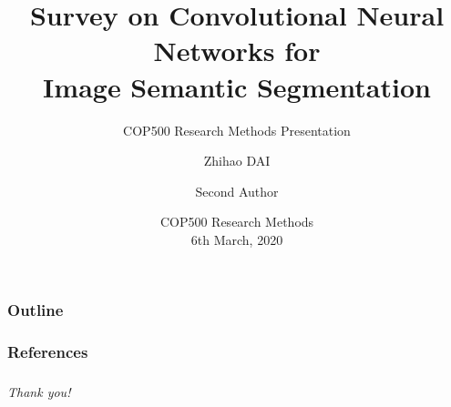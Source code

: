 \documentclass[hyperref={bookmarks=false},aspectratio=169]{beamer}
\title[]
{\bfseries{Survey on Convolutional Neural Networks for\\
Image Semantic Segmentation}}
\subtitle{{\small
COP500 Research Methods Presentation
}}
\author[]
{
Zhihao DAI\inst{1}
\and Second Author\inst{1}
}
\institute[Loughborough University]
{
    Loughborough University\inst{1}
}
\date[COP500, 2020]
{
    COP500 Research Methods\\
	6th March, 2020}
\begin{document}
\frame{\titlepage}  %

\begin{frame}
\frametitle{Outline}
\tableofcontents
\end{frame}




\begin{frame}[allowframebreaks]
\frametitle{References}
\tiny
\end{frame}


\begin{frame}
\frametitle{}
\centering
{\Huge \textit{Thank you!}}
\end{frame}
\end{document}
